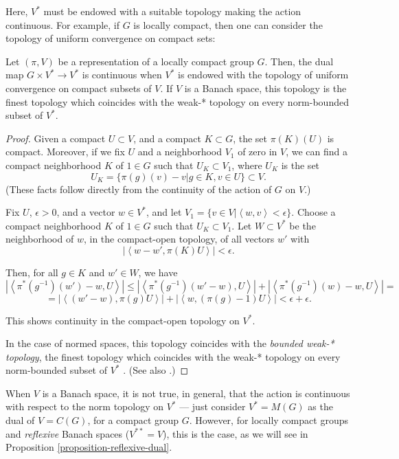 Here, $V^*$ must be endowed with a suitable topology making the action continuous. For example, if $G$ is locally compact, then one can consider the topology of uniform convergence on compact sets:

\begin{lemma}
\label{lemma-topology-dual}
 Let $(\pi, V)$ be a representation of a locally compact group $G$. Then, the dual map $G\times V^*\to V^*$ is continuous when $V^*$ is endowed with the topology of uniform convergence on compact subsets of $V$. If $V$ is a Banach space, this topology is the finest topology which coincides with the weak-* topology on every norm-bounded subset of $V^*$.
\end{lemma}

\begin{proof}
 Given a compact $U\subset V$, and a compact $K\subset G$, the set $\pi(K)(U)$ is compact. Moreover, 
if we fix $U$ and a neighborhood $V_1$ of zero in $V$, we can find a compact neighborhood $K$ of $1\in G$ such that $U_K\subset V_1$, where $U_K$ is the set
 $$U_K=\{\pi(g)(v)-v| g\in K, v\in U\}\subset V.$$
(These facts follow directly from the continuity of the action of $G$ on $V$.)
 
 Fix $U$, $\epsilon>0$, and a vector $w\in V^*$, and let $V_1 = \{ v\in V| \left < w, v\right> <\epsilon\}$. Choose a compact neighborhood $K$ of $1\in G$ such that $U_K\subset V_1$. Let $W\subset V^*$ be the neighborhood of $w$, in the compact-open topology, of all vectors $w'$ with
 $$ |\left < w-w', \pi(K)U\right>|<\epsilon.$$
 
 Then, for all $g\in K$ and $w'\in W$, we have 
 $$ | \left < \pi^*(g^{-1}) (w')-w, U\right> | \le |\left < \pi^*(g^{-1}) (w'-w), U\right> | + | \left < \pi^*(g^{-1}) (w)-w, U\right> | =$$
 $$ = |\left < (w'-w), \pi(g) U\right> | + | \left < w, (\pi(g) - 1) U\right> | < \epsilon + \epsilon.$$

This shows continuity in the compact-open topology on $V^*$.

In the case of normed spaces, this topology coincides with the \emph{bounded weak-* topology}, the finest topology which coincides with the weak-* topology on every norm-bounded subset of $V^*$ \cite[\S II.5, Lemma 2]{Day}. (See also \cite[\S 2.7 and 3.4]{Megginson}.)
\end{proof}



When $V$ is a Banach space, it is not true, in general, that the action is continuous with respect to the norm topology on $V^*$ --- just consider $V^*=M(G)$ as the dual of $V=C(G)$, for a compact group $G$. However, for locally compact groups and \emph{reflexive} Banach spaces ($V^{**}=V$), this is the case, as we will see in Proposition \ref{proposition-reflexive-dual}.



